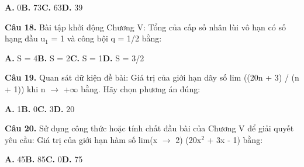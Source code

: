 \documentclass[11pt,a4paper]{article}
\begin{document}
\hspace*{1.5em}\textbf{A.} 0\quad\quad \textbf{B.} 73\quad\quad \textbf{C.} 63\quad\quad \textbf{D.} 39\par\vspace{2pt}
\textbf{\color{primary} Câu 18.} Bài tập khởi động Chương V: Tổng của cấp số nhân lùi vô hạn có số hạng đầu u$_1$ = 1 và công bội q = 1/2 bằng:\par
\hspace*{1.5em}\textbf{A.} S = 4\quad\quad \textbf{B.} S = 2\quad\quad \textbf{C.} S = 1\quad\quad \textbf{D.} S = 3/2\par\vspace{2pt}
\textbf{\color{primary} Câu 19.} Quan sát dữ kiện đề bài: Giá trị của giới hạn dãy số lim ((20n + 3) / (n + 1)) khi n $\to$ +$\infty$ bằng. Hãy chọn phương án đúng:\par
\hspace*{1.5em}\textbf{A.} 1\quad\quad \textbf{B.} 0\quad\quad \textbf{C.} 3\quad\quad \textbf{D.} 20\par\vspace{2pt}
\textbf{\color{primary} Câu 20.} Sử dụng công thức hoặc tính chất đầu bài của Chương V để giải quyết yêu cầu: Giá trị của giới hạn hàm số lim(x $\to$ 2) (20x$^2$ + 3x - 1) bằng:\par
\hspace*{1.5em}\textbf{A.} 45\quad\quad \textbf{B.} 85\quad\quad \textbf{C.} 0\quad\quad \textbf{D.} 75\par\vspace{2pt}
\end{document}
